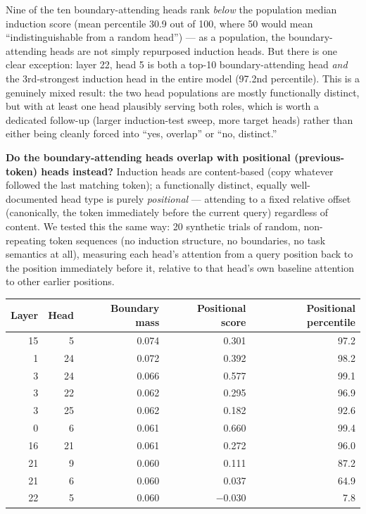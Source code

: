 \documentclass[11pt]{article}
\begin{document}
Nine of the ten boundary-attending heads rank \emph{below} the population median induction score (mean percentile 30.9 out of 100, where 50 would mean ``indistinguishable from a random head'') --- as a population, the boundary-attending heads are not simply repurposed induction heads. But there is one clear exception: layer 22, head 5 is both a top-10 boundary-attending head \emph{and} the 3rd-strongest induction head in the entire model (97.2nd percentile). This is a genuinely mixed result: the two head populations are mostly functionally distinct, but with at least one head plausibly serving both roles, which is worth a dedicated follow-up (larger induction-test sweep, more target heads) rather than either being cleanly forced into ``yes, overlap'' or ``no, distinct.''

\textbf{Do the boundary-attending heads overlap with positional (previous-token) heads instead?} Induction heads are content-based (copy whatever followed the last matching token); a functionally distinct, equally well-documented head type is purely \emph{positional} --- attending to a fixed relative offset (canonically, the token immediately before the current query) regardless of content. We tested this the same way: 20 synthetic trials of random, non-repeating token sequences (no induction structure, no boundaries, no task semantics at all), measuring each head's attention from a query position back to the position immediately before it, relative to that head's own baseline attention to other earlier positions.

\begin{table}[htbp]
\centering
\small
\begin{tabular}{rrrrr}
\toprule
Layer & Head & Boundary mass & Positional score & Positional percentile \\
\midrule
15 & 5  & 0.074 & 0.301  & 97.2 \\
1  & 24 & 0.072 & 0.392  & 98.2 \\
3  & 24 & 0.066 & 0.577  & 99.1 \\
3  & 22 & 0.062 & 0.295  & 96.9 \\
3  & 25 & 0.062 & 0.182  & 92.6 \\
0  & 6  & 0.061 & 0.660  & 99.4 \\
16 & 21 & 0.061 & 0.272  & 96.0 \\
21 & 9  & 0.060 & 0.111  & 87.2 \\
21 & 6  & 0.060 & 0.037  & 64.9 \\
22 & 5  & 0.060 & $-0.030$ & 7.8 \\
\bottomrule
\end{tabular}
\end{table}
\end{document}
